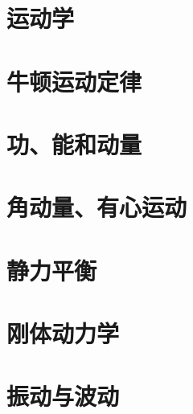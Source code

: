 \documentclass[12pt,a4paper,openany]{book}
\begin{document}
\chapter{运动学}


\chapter{牛顿运动定律}


\chapter{功、能和动量}


\chapter{角动量、有心运动}


\chapter{静力平衡}


\chapter{刚体动力学}


\chapter{振动与波动}

\end{document}
